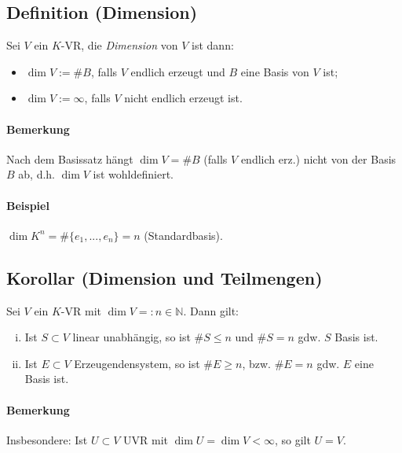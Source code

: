  \subsection{Definition (Dimension)}
 	\begin{Definition}[Dimension]
 		Sei $V$ ein $K$-VR, die \emph{Dimension} von $ V $ ist dann:
 		\begin{itemize}
 			\item $\dim V:= \#B$, falls $ V $ endlich erzeugt und $B$ eine Basis von $V$ ist;
 			\item $\dim V:= \infty$, falls $V$ nicht endlich erzeugt ist.
 		\end{itemize}
 	\end{Definition}

 	\paragraph{Bemerkung}
 		Nach dem Basissatz hängt $\dim V = \#B$ (falls $V$ endlich erz.) nicht von der Basis $B$ ab, d.h. $\dim V$ ist wohldefiniert.

 	\paragraph{Beispiel}
 		$\dim K^n = \#\{e_1,...,e_n\} = n$ (Standardbasis).

 \subsection{Korollar (Dimension und Teilmengen)}
 	\begin{Korollar}
 		Sei $ V $ ein $ K $-VR mit $\dim V =: n\in \mathbb{N}$. Dann gilt:
 		\begin{enumerate}[(i)]
 			\item Ist $S \subset V$ linear unabhängig, so ist $\# S \leq n$ und $\# S = n$ gdw. $ S $ Basis ist.
 			\item Ist $E \subset V$ Erzeugendensystem, so ist $\#E \geq n$, bzw. $\#E = n$ gdw. $ E $ eine Basis ist.
 		\end{enumerate}
 	\end{Korollar}

 	\paragraph{Bemerkung}
 		Insbesondere: Ist $U\subset V$ UVR mit $\dim U=\dim V < \infty$, so gilt $ U=V $.

